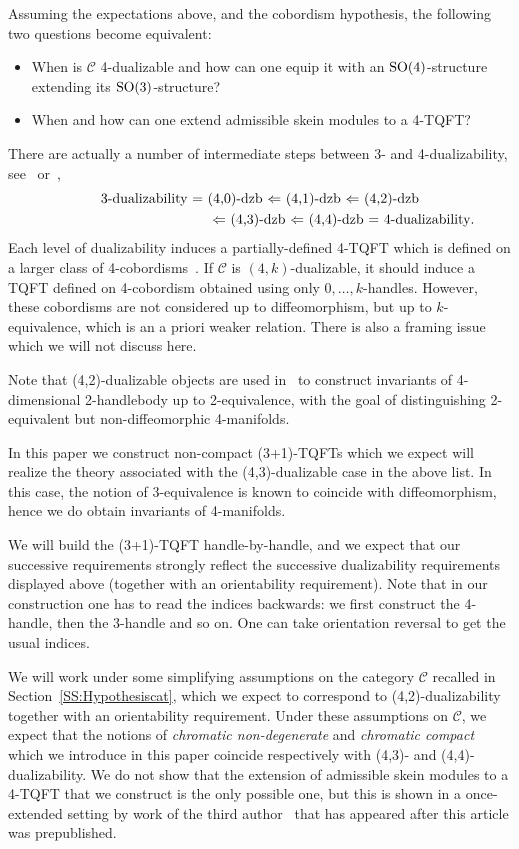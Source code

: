 \documentclass[10pt,a4paper]{amsart}
\numberwithin{equation}{section}
\numberwithin{theorem}{section}
\numberwithin{proposition}{section}
\numberwithin{definition}{section}
\numberwithin{lemma}{section}
\numberwithin{corollary}{section}
\numberwithin{remark}{section}
\numberwithin{example}{section}
\newcommand{\CC}{\mathcal{C}}
\begin{document}
Assuming the expectations above, and the cobordism hypothesis, the following two questions become equivalent:
\begin{itemize}\itemsep=0pt
\item When is $\CC$ 4-dualizable and how can one equip it with an ${\rm SO}(4)$-structure extending its ${\rm SO}(3)$-structure?
\item When and how can one extend admissible skein modules to a 4-TQFT?
\end{itemize}
There are actually a number of intermediate steps between 3- and 4-dualizability, see~\cite[Definition~2.25]{Haioun} or~\cite{Lurie},
\begin{gather*}
 \text{3-dualizability = (4,0)-dzb $\Leftarrow$ (4,1)-dzb $\Leftarrow$ (4,2)-dzb}\\
 \hphantom{\text{3-dualizability = (4,0)-dzb }}{}
 \text{$\Leftarrow$ (4,3)-dzb $\Leftarrow$ (4,4)-dzb = 4-dualizability}.
\end{gather*}
Each
level of
dualizability
induces a partially-defined
4-TQFT
which is defined on a
larger
class of 4-cobordisms~\cite[Section~3.4]{Lurie}. If $\CC$ is $(4,k)$-dualizable, it should induce a TQFT defined
on
4-cobordism obtained using only $0,\dots, k$-handles. However, these cobordisms are not considered up to diffeomorphism, but up to $k$-equivalence, which is an a priori weaker relation. There is also a framing issue which we will not discuss here.

Note that (4,2)-dualizable objects are used in~\cite{BD22, BD21} to construct invariants of 4-dimensional 2-handlebody up to 2-equivalence, with the goal of distinguishing 2-equivalent but non-dif\-feo\-mor\-phic 4-manifolds.

In this paper we construct non-compact (3+1)-TQFTs which we expect
will
realize the theory associated with the (4,3)-dualizable case in the above list. In this case, the notion of 3-equivalence is known to coincide with diffeomorphism, hence we do obtain invariants of 4-manifolds.

We will build the (3+1)-TQFT handle-by-handle, and we expect that our successive requirements strongly reflect the successive dualizability requirements displayed above (together with an orientability requirement). Note that in our construction one has to read the indices backwards: we first construct the 4-handle, then the 3-handle and so on. One can take orientation reversal to get the usual indices.

We will work under some simplifying assumptions on the category $\CC$ recalled in Section~\ref{SS:Hypothesiscat}, which we expect
to
correspond to (4,2)-dualizability together with an orientability requirement. Under these assumptions on $\CC$, we expect that the notions of \emph{chromatic non-degenerate} and \emph{chromatic compact} which we introduce in this paper coincide respectively with (4,3)- and (4,4)-dualizability. We do not show that the extension of admissible skein modules to a 4-TQFT that we construct is the only possible one, but this is shown in a once-extended setting by work of the third author~\cite[Theorem~6.1]{HaiounHandle} that
has
appeared after this article was prepublished.
\end{document}
